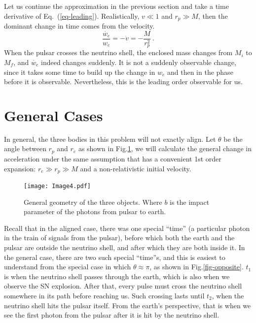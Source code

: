 \documentclass[aps,showpacs,onecolumn,floats,prd,superscriptaddress,nofootinbib]{revtex4}
\begin{document}
Let us continue the approximation in the previous section and take a time derivative of Eq.~(\ref{eq-leading}). Realistically, $v \ll1$ and $r_p\gg M$, then the dominant change in time comes from the velocity.
\begin{equation}
\frac{\dot{w_e}}{w_e} = -\dot{v} = -\frac{M}{r_p^2}~.
\label{eq-AccChange}
\end{equation}
When the pulsar crosses the neutrino shell, the enclosed mass changes from $M_i$ to $M_f$, and $\dot{w_e}$ indeed changes suddenly. It is not a suddenly observable change, since it takes some time to build up the change in $w_e$ and then in the phase before it is observable. Nevertheless, this is the leading order observable for us.

\section{General Cases}
\label{sec-3d}

In general, the three bodies in this problem will not exactly align. Let $\theta$ be the angle between $r_p$ and $r_e$ as shown in Fig.\ref{fig:3}, we will calculate the general change in acceleration under the same assumption that has a convenient 1st order expansion: $r_e\gg r_p\gg M$ and a non-relativistic initial velocity.

\begin{figure}[t]
\begin{center}
\texttt{[image: Image4.pdf]}
\vspace{-8 mm}\caption{General geometry of the three objects. Where $b$ is the impact parameter of the photons from pulsar to earth. } 
\label{fig:3}
\end{center}
\end{figure}

Recall that in the aligned case, there was one special ``time'' (a particular photon in the train of signals from the pulsar), before which both the earth and the pulsar are outside the neutrino shell, and after which they are both inside it. In the general case, there are two such special ``time''s, and this is easiest to understand from the special case in which $\theta \approx \pi$, as shown in Fig.\ref{fig-opposite}. $t_1$ is when the neutrino shell passes through the earth, which is also when we observe the SN explosion. After that, every pulse must cross the neutrino shell somewhere in its path before reaching us. Such crossing lasts until $t_2$, when the neutrino shell hits the pulsar itself. From the earth's perspective, that is when we see the first photon from the pulsar after it is hit by the neutrino shell.
\end{document}
